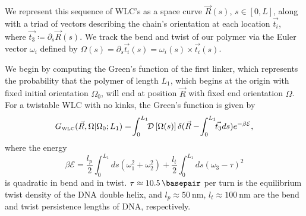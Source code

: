 \documentclass[%
 reprint,
superscriptaddress,
showpacs,preprintnumbers,
 amsmath,amssymb,
 aps,
 prl,
]{revtex4-1}
\newcommand{\gwlc}[2][\Omega_0; L_0]{G_\text{\tiny WLC}(#2|#1)}
\newcommand{\greens}[2][\Omega_0; L]{G(#2|#1)}
\newcommand{\pathd}[1]{\mathcal{D}\left[#1\right]}
\newcommand{\energy}{\mathcal{E}}
\begin{document}
We represent this sequence of WLC's as a space curve $\vec{R}(s)$, $s\in[0,L]$, along
    with a triad of vectors describing the chain's orientation at each location
    $\vec{t_i}$, where $\vec{t_3} \coloneqq \partial_s \vec{R}(s)$.
We track the bend and twist of our polymer via the Euler vector $\omega_i$
    defined by $\Omega(s) = \partial_s \vec{t_i}(s) = \omega_i(s) \times \vec{t_i}(s)$.

We begin by computing the Green's function of the first linker, which represents
the probability that the polymer of length $L_1$, which begins at
the origin with fixed initial orientation $\Omega_0$, will end at position
$\vec{R}$ with fixed end orientation $\Omega$.
For a twistable WLC with no kinks, the Green's function is given by
\begin{equation}\label{eq:path}
    \gwlc[\Omega_0;L_1]{\vec{R}, \Omega} =\! \int_{0}^{L_1} \!\! \pathd{\Omega(s)}
              \delta(\vec{R} - \!\int_{0}^{L_1} \!\!\vec{t_3} ds)
              e^{-\beta \mathcal{E}},
\end{equation}
    where the energy
\begin{equation}\label{eq:energy}
    \beta\energy = \frac{l_p}{2}\int_{0}^{L_1} ds
    (\omega_1^2 + \omega_2 ^2) + \frac{l_t}{2}\int_{0}^{L_1} ds
    {\left(\omega_3 - \tau\right)}^2
\end{equation}
    is quadratic in bend and in twist. {$\tau \approx \SI{10.5}{\basepair}$}
    per turn is the equilibrium twist density of the DNA double helix, and {$l_p
    \approx \SI{50}{\nano\metre}$}, {$l_t \approx \SI{100}{\nano\metre}$} are
    the bend and twist persistence lengths of DNA, respectively.
\end{document}
